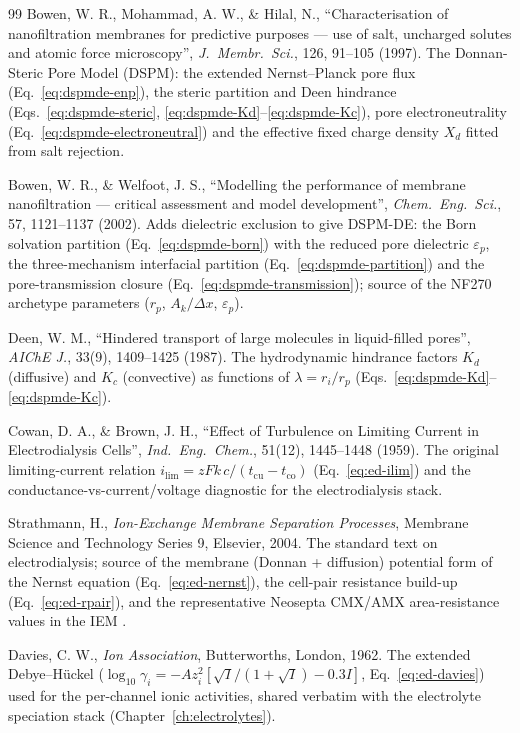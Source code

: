 \documentclass[11pt,a4paper]{article}
\begin{document}
\begin{thebibliography}{99}
 Bowen, W. R., Mohammad, A. W., \&
Hilal, N., ``Characterisation of nanofiltration membranes for predictive
purposes --- use of salt, uncharged solutes and atomic force
microscopy'', \emph{J.\ Membr.\ Sci.}, 126, 91--105 (1997). The
Donnan-Steric Pore Model (DSPM): the extended Nernst--Planck pore flux
(Eq.~\ref{eq:dspmde-enp}), the steric partition and Deen hindrance
(Eqs.~\ref{eq:dspmde-steric}, \ref{eq:dspmde-Kd}--\ref{eq:dspmde-Kc}),
pore electroneutrality (Eq.~\ref{eq:dspmde-electroneutral}) and the
effective fixed charge density $X_d$ fitted from salt rejection.

 Bowen, W. R., \& Welfoot, J. S., ``Modelling
the performance of membrane nanofiltration --- critical assessment and
model development'', \emph{Chem.\ Eng.\ Sci.}, 57, 1121--1137 (2002).
Adds dielectric exclusion to give DSPM-DE: the Born solvation partition
(Eq.~\ref{eq:dspmde-born}) with the reduced pore dielectric
$\varepsilon_p$, the three-mechanism interfacial partition
(Eq.~\ref{eq:dspmde-partition}) and the pore-transmission closure
(Eq.~\ref{eq:dspmde-transmission}); source of the NF270 archetype
parameters ($r_p$, $A_k/\Delta x$, $\varepsilon_p$).

 Deen, W. M., ``Hindered transport of large molecules
in liquid-filled pores'', \emph{AIChE J.}, 33(9), 1409--1425 (1987).
The hydrodynamic hindrance factors $K_d$ (diffusive) and $K_c$
(convective) as functions of $\lambda=r_i/r_p$
(Eqs.~\ref{eq:dspmde-Kd}--\ref{eq:dspmde-Kc}).

 Cowan, D. A., \& Brown, J. H., ``Effect of
Turbulence on Limiting Current in Electrodialysis Cells'', \emph{Ind.\
Eng.\ Chem.}, 51(12), 1445--1448 (1959). The original limiting-current
relation $i_\text{lim} = zFk\,c/(t_\text{cu}-t_\text{co})$
(Eq.~\ref{eq:ed-ilim}) and the conductance-vs-current/voltage diagnostic
for the electrodialysis stack.

 Strathmann, H., \emph{Ion-Exchange Membrane
Separation Processes}, Membrane Science and Technology Series 9,
Elsevier, 2004. The standard text on electrodialysis; source of the
membrane (Donnan + diffusion) potential form of the Nernst equation
(Eq.~\ref{eq:ed-nernst}), the cell-pair resistance build-up
(Eq.~\ref{eq:ed-rpair}), and the representative Neosepta CMX/AMX
area-resistance values in the IEM \file{.dat}.

 Davies, C. W., \emph{Ion Association}, Butterworths,
London, 1962. The extended Debye--H\"uckel ($\log_{10}\gamma_i =
-Az_i^2[\sqrt I/(1+\sqrt I) - 0.3I]$, Eq.~\ref{eq:ed-davies}) used for
the per-channel ionic activities, shared verbatim with the electrolyte
speciation stack (Chapter~\ref{ch:electrolytes}).


\end{thebibliography}
\end{document}
